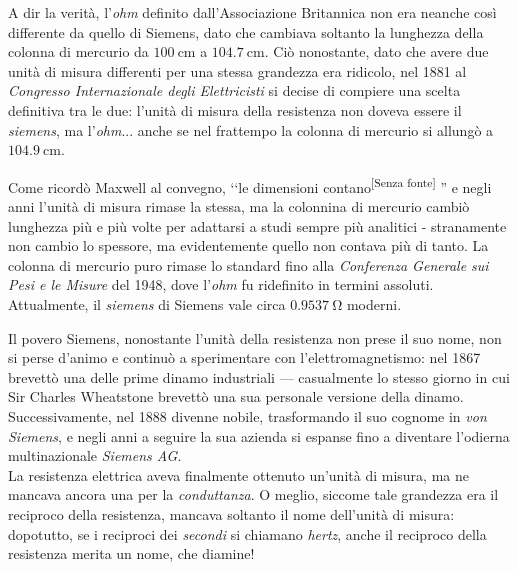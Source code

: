 \begin{digressionwt}
	A dir la verità, l'\textit{ohm} definito dall'Associazione Britannica non era neanche così differente da quello di Siemens, dato che cambiava soltanto la lunghezza della colonna di mercurio da $\SI{100}{\centi\meter}$ a $\SI{104.7}{\centi\meter}$. Ciò nonostante, dato che avere due unità di misura differenti per una stessa grandezza era ridicolo, nel 1881 al \textit{Congresso Internazionale degli Elettricisti} si decise di compiere una scelta definitiva tra le due: l'unità di misura della resistenza non doveva essere il \textit{siemens}, ma l'\textit{ohm}... anche se nel frattempo la colonna di mercurio si allungò a $\SI{104.9}{\centi\meter}$.\newline
	
	\noindent Come ricordò Maxwell al convegno, ‘‘le dimensioni contano\textsuperscript{[Senza fonte]}%
	 '' e negli anni l'unità di misura rimase la stessa, ma la colonnina di mercurio cambiò lunghezza più e più volte per adattarsi a studi sempre più analitici - stranamente non cambio lo spessore, ma evidentemente quello non contava più di tanto. La colonna di mercurio puro rimase lo standard fino alla \textit{Conferenza Generale sui Pesi e le Misure} del 1948, dove l'\textit{ohm} fu ridefinito in termini assoluti. Attualmente, il \textit{siemens} di Siemens vale circa $\SI{0.9537}{\ohm}$ moderni.
	
	Il povero Siemens, nonostante l'unità della resistenza non prese il suo nome, non si perse d'animo e continuò a sperimentare con l'elettromagnetismo: nel 1867 brevettò una delle prime dinamo industriali --- casualmente lo stesso giorno in cui Sir Charles Wheatstone brevettò una sua personale versione della dinamo. Successivamente, nel 1888 divenne nobile, trasformando il suo cognome in \textit{von Siemens}, e negli anni a seguire la sua azienda si espanse fino a diventare l'odierna multinazionale \textit{Siemens AG}.\newline~\\
	La resistenza elettrica aveva finalmente ottenuto un'unità di misura, ma ne mancava ancora una per la \textit{conduttanza}. O meglio, siccome tale grandezza era il reciproco della resistenza, mancava soltanto il nome dell'unità di misura: dopotutto, se i reciproci dei \textit{secondi} si chiamano \textit{hertz}, anche il reciproco della resistenza merita un nome, che diamine!
	

\end{digressionwt}
